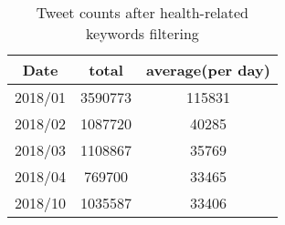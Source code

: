 \begin{table}[!htbp]
    \centering
    \hspace{0.5cm}
    \begin{tabular}{ccc}
        Date & total & average(per day) \\ \hline
        2018/01 & 3590773 & 115831 \\
        2018/02 & 1087720 & 40285 \\
        2018/03 & 1108867 & 35769 \\
        2018/04 & 769700 & 33465 \\
        2018/10 & 1035587 & 33406 \\
    \end{tabular}
    \caption{Tweet counts after health-related keywords filtering}
    \label{tab:filtering2}
\end{table}

